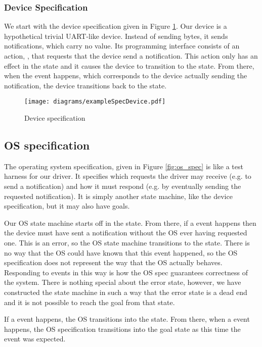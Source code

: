 \subsubsection{Device Specification}

We start with the device specification given in Figure \ref{fig:dev_spec}. Our device is a hypothetical trivial UART-like device. Instead of sending bytes, it sends notifications, which carry no value. Its programming interface consists of an action, , that requests that the device send a notification. This action only has an effect in the  state and it causes the device to transition to the  state. From there, when the  event happens, which corresponds to the device actually sending the notification, the device transitions back to the  state.

\begin{figure}
\centering
\texttt{[image: diagrams/exampleSpecDevice.pdf]}
\caption{Device specification}
\label{fig:dev_spec}
\end{figure}

\subsection{OS specification}

The operating system specification, given in Figure \ref{fig:os_spec} is like a test harness for our driver. It specifies which requests the driver may receive (e.g. to send a notification) and how it must respond (e.g. by eventually sending the requested notification). It is simply another state machine, like the device specification, but it may also have goals.

Our OS state machine starts off in the  state. From there, if a  event happens then the device must have sent a notification without the OS ever having requested one. This is an error, so the OS state machine transitions to the  state. There is no way that the OS could have known that this event happened, so the OS specification does not represent the way that the OS actually behaves. Responding to events in this way is how the OS spec guarantees correctness of the system. There is nothing special about the error state, however, we have constructed the state machine in such a way that the error state is a dead end and it is not possible to reach the goal from that state.

If a  event happens, the OS transitions into the  state. From there, when a  event happens, the OS specification transitions into the goal state as this time the  event was expected. 

